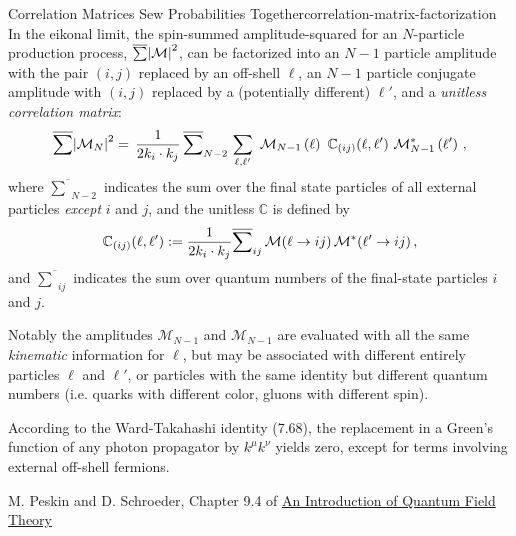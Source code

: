 \begin{proposition}{Correlation Matrices Sew Probabilities Together}{correlation-matrix-factorization}
    In the eikonal limit, the spin-summed amplitude-squared for an \(N\)-particle production process, \(\overline{\sum}\abs{\mathcal{M}}^2\), can be factorized into an \(N-1\) particle amplitude with the pair \((i,j)\) replaced by an off-shell \(\ell\), an \(N-1\) particle conjugate amplitude with \((i,j)\) replaced by a (potentially different) \(\ell'\), and a \textit{unitless correlation matrix}:
    \begin{align}
        \label{eq:split-factorized-square-amplitude}
        \overline{\sum}
        \abs{\mathcal{M}_N}^2
        =
        \,
        \frac{1}{2 k_i \cdot k_j}
        \,
        \overline{\sum}_{N-2}
        \,
        \sum_{\ell, \ell'}
        \,\,
        \mathcal{M}_{N-1}\le(\ell\ri)
        \,\,
        \cmatrix
        \,\,
        \mathcal{M}^*_{N-1}\le(\ell'\ri)
        \,,
    \end{align}
    where \(\overline{\sum}_{N-2}\) indicates the sum over the final state particles of all external particles \textit{except} \(i\) and \(j\), and the unitless  \(\mathbb{C}\) is defined by
    \begin{align}
        \mathbb{C}_{(ij)}(\ell, \ell')
        :=
        \frac{1}{2 k_i \cdot k_j}
        \overline{\sum}_{ij}
        \,
        \mathcal{M}(\ell \to i j)
        \,
        \mathcal{M}^*(\ell' \to i j)
        \,,
    \end{align}
    and \(\overline{\sum}_{ij}\) indicates the sum over quantum numbers of the final-state particles \(i\) and \(j\).

    Notably the amplitudes \(\mathcal{M}_{N-1}\) and \(\mathcal{M}_{N-1}\) are evaluated with all the same \textit{kinematic} information for \(\ell\), but may be associated with different entirely particles \(\ell\) and \(\ell'\), or particles with the same identity but different quantum numbers (i.e. quarks with different color, gluons with different spin).
\end{proposition}

\vspace{-20pt}

\begingroup
\setlength \epigraphwidth {\textwidth}
\setlength \epigraphrule {0pt}
\renewcommand {\epigraphflush} {center}
\renewcommand {\sourceflush} {center}
\epigraph{According to the Ward-Takahashi identity (7.68), the replacement in a Green’s function of any photon propagator by \(k^\mu k^\nu\) yields zero, except for terms involving external off-shell fermions.}{M. Peskin and D. Schroeder, Chapter 9.4 of \underline{An Introduction of Quantum Field Theory} \cite{Peskin:1995ev}}


